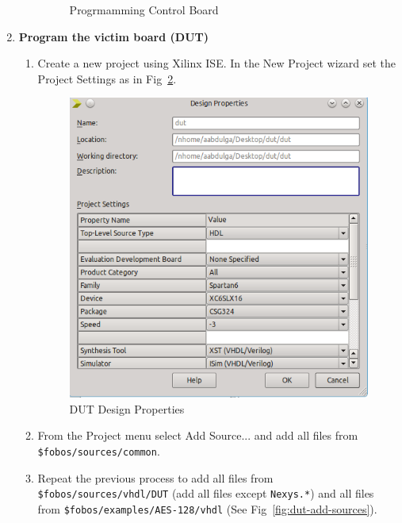 \begin{enumerate}
\begin{enumerate}
\begin{figure}[H]
\begin{center}
		\caption{\label{fig:ctrl-program}Progrmamming Control Board}
		\end{center}
		\vspace{-1ex}
		\end{figure}
  \end{enumerate}
\item \textbf{Program the victim board (DUT)}
  \begin{enumerate}
  \item Create a new project using Xilinx ISE. In the New Project wizard set the Project Settings as in Fig~\ref{fig:dut-design-properties}.
		\begin{figure}[H]
		\begin{center}
		\includegraphics[scale=0.6]{figures/dut-design-properties}
		\caption{\label{fig:dut-design-properties}DUT Design Properties}
		\end{center}
		\vspace{-1ex}
		\end{figure}
  \item From the Project menu select Add Source... and add all files from \texttt{\$fobos/sources/common}.
  \item Repeat the previous process to add all files from \texttt{\$fobos/sources/vhdl/DUT} (add all files except \texttt{Nexys.*}) and all files from \texttt{\$fobos/examples/AES-128/vhdl}  (See Fig~\ref{fig:dut-add-sources}).

\end{enumerate}
\end{enumerate}
